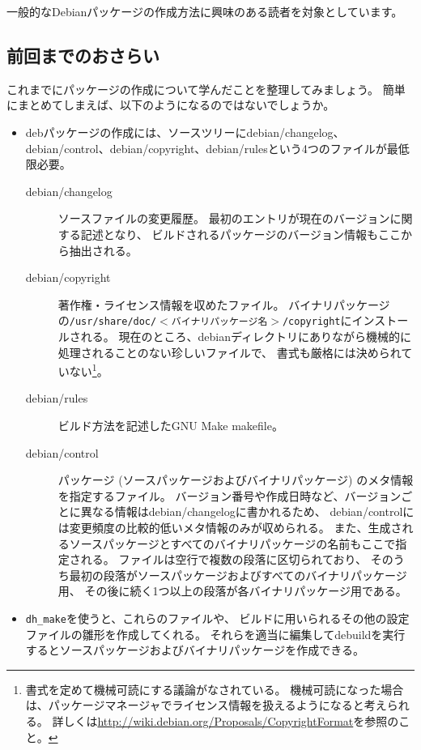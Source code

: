 \documentclass[mingoth,a4paper]{jsarticle}
\begin{document}
一般的なDebianパッケージの作成方法に興味のある読者を対象としています。

\subsection{前回までのおさらい}

これまでにパッケージの作成について学んだことを整理してみましょう。
簡単にまとめてしまえば、以下のようになるのではないでしょうか。

\begin{itemize}
 \item debパッケージの作成には、ソースツリーにdebian/changelog、debian/control、debian/copyright、debian/rulesという4つのファイルが最低限必要。
\begin{description}
 \item[debian/changelog] ソースファイルの変更履歴。
    最初のエントリが現在のバージョンに関する記述となり、
    ビルドされるパッケージのバージョン情報もここから抽出される。
 \item[debian/copyright] 著作権・ライセンス情報を収めたファイル。
    バイナリパッケージの\texttt{/usr/share/doc/$<$バイナリパッケージ名$>$/copyright}にインストールされる。
    現在のところ、debianディレクトリにありながら機械的に処理されることのない珍しいファイルで、
    書式も厳格には決められていない\footnote{書式を定めて機械可読にする議論がなされている。
    機械可読になった場合は、パッケージマネージャでライセンス情報を扱えるようになると考えられる。
    詳しくは\url{http://wiki.debian.org/Proposals/CopyrightFormat}を参照のこと。}。
 \item[debian/rules] ビルド方法を記述したGNU Make makefile。
 \item[debian/control] パッケージ (ソースパッケージおよびバイナリパッケージ) のメタ情報を指定するファイル。
    バージョン番号や作成日時など、バージョンごとに異なる情報はdebian/changelogに書かれるため、
    debian/controlには変更頻度の比較的低いメタ情報のみが収められる。
    また、生成されるソースパッケージとすべてのバイナリパッケージの名前もここで指定される。
    ファイルは空行で複数の段落に区切られており、
    そのうち最初の段落がソースパッケージおよびすべてのバイナリパッケージ用、
    その後に続く1つ以上の段落が各バイナリパッケージ用である。
\end{description} 
 \item \texttt{dh\_make}を使うと、これらのファイルや、
  ビルドに用いられるその他の設定ファイルの雛形を作成してくれる。
  それらを適当に編集してdebuildを実行するとソースパッケージおよびバイナリパッケージを作成できる。
\end{itemize}
\end{document}
